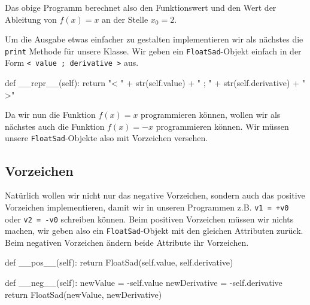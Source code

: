 \documentclass[
  letterpaper,
  DIV=11,
  oneside]{scrreprt}
\newenvironment{Shaded}{\begin{snugshade}}{\end{snugshade}}
\newcommand{\BuiltInTok}[1]{\textcolor[rgb]{0.00,0.23,0.31}{#1}}
\newcommand{\ControlFlowTok}[1]{\textcolor[rgb]{0.00,0.23,0.31}{#1}}
\newcommand{\FunctionTok}[1]{\textcolor[rgb]{0.28,0.35,0.67}{#1}}
\newcommand{\KeywordTok}[1]{\textcolor[rgb]{0.00,0.23,0.31}{#1}}
\newcommand{\NormalTok}[1]{\textcolor[rgb]{0.00,0.23,0.31}{#1}}
\newcommand{\OperatorTok}[1]{\textcolor[rgb]{0.37,0.37,0.37}{#1}}
\newcommand{\StringTok}[1]{\textcolor[rgb]{0.13,0.47,0.30}{#1}}
\newcommand{\VariableTok}[1]{\textcolor[rgb]{0.07,0.07,0.07}{#1}}
\theoremstyle{definition}
\theoremstyle{definition}
\theoremstyle{remark}
\begin{document}
Das obige Programm berechnet also den Funktionswert und den Wert der
Ableitung von \(f(x) = x\) an der Stelle \(x_0 = 2\).

Um die Ausgabe etwas einfacher zu gestalten implementieren wir als
nächstes die \texttt{print} Methode für unsere Klasse. Wir geben ein
\texttt{FloatSad}-Objekt einfach in der Form
\texttt{\textless{}\ value\ ;\ derivative\ \textgreater{}} aus.

\begin{Shaded}
\begin{Highlighting}[]
\KeywordTok{def} \FunctionTok{\_\_repr\_\_}\NormalTok{(}\VariableTok{self}\NormalTok{):}
        \ControlFlowTok{return} \StringTok{"\textless{} "} \OperatorTok{+} \BuiltInTok{str}\NormalTok{(}\VariableTok{self}\NormalTok{.value) }\OperatorTok{+} \StringTok{" ; "} \OperatorTok{+} \BuiltInTok{str}\NormalTok{(}\VariableTok{self}\NormalTok{.derivative) }\OperatorTok{+} \StringTok{" \textgreater{}"}
\end{Highlighting}
\end{Shaded}

Da wir nun die Funktion \(f(x) = x\) programmieren können, wollen wir
als nächstes auch die Funktion \(f(x) = -x\) programmieren können. Wir
müssen unsere \texttt{FloatSad}-Objekte also mit Vorzeichen versehen.

\hypertarget{vorzeichen}{%
\subsection{Vorzeichen}\label{vorzeichen}}

Natürlich wollen wir nicht nur das negative Vorzeichen, sondern auch das
positive Vorzeichen implementieren, damit wir in unseren Programmen z.B.
\texttt{v1\ =\ +v0} oder \texttt{v2\ =\ -v0} schreiben können. Beim
positiven Vorzeichen müssen wir nichts machen, wir geben also ein
\texttt{FloatSad}-Objekt mit den gleichen Attributen zurück. Beim
negativen Vorzeichen ändern beide Attribute ihr Vorzeichen.

\begin{Shaded}
\begin{Highlighting}[]
\KeywordTok{def} \FunctionTok{\_\_pos\_\_}\NormalTok{(}\VariableTok{self}\NormalTok{):}
        \ControlFlowTok{return}\NormalTok{ FloatSad(}\VariableTok{self}\NormalTok{.value, }\VariableTok{self}\NormalTok{.derivative)}
    
\KeywordTok{def} \FunctionTok{\_\_neg\_\_}\NormalTok{(}\VariableTok{self}\NormalTok{):}
\NormalTok{    newValue }\OperatorTok{=} \OperatorTok{{-}}\VariableTok{self}\NormalTok{.value}
\NormalTok{    newDerivative }\OperatorTok{=} \OperatorTok{{-}}\VariableTok{self}\NormalTok{.derivative}
    \ControlFlowTok{return}\NormalTok{ FloatSad(newValue, newDerivative)}
\end{Highlighting}
\end{Shaded}
\end{document}
